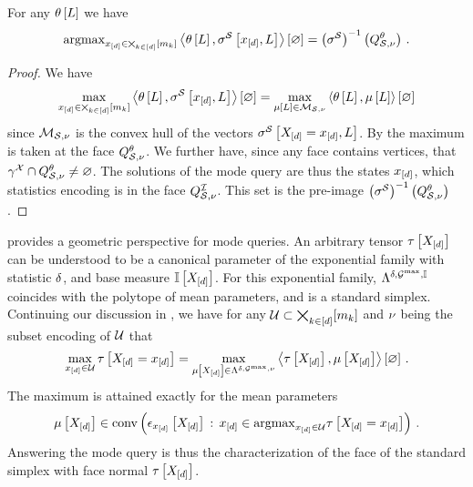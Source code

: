 \begin{theorem}
    \label{the:modeQueryFaceBM}
    For any $\theta\left[L\right]$ we have
    \begin{align*}
        \mathrm{argmax}_{x_{[d]}\in\bigtimes_{k\in[d]}[m_{k}]} \left\langle \theta\left[L\right],\sigma^{\mathcal{S}}\left[x_{[d]},L\right]\right\rangle \left[ \varnothing \right] =
        \left(\sigma^{\mathcal{S}}\right)^{-1}\left(Q^{\theta}_{\mathcal{S},\nu}\right) \, .
    \end{align*}
\end{theorem}
\begin{proof}
    We have
    \begin{align*}
        \max_{x_{[d]}\in\bigtimes_{k\in[d]}[m_{k}]} \left\langle \theta\left[L\right],\sigma^{\mathcal{S}}\left[x_{[d]},L\right]\right\rangle \left[ \varnothing \right] =
        \max_{\mu\left[L\right]\in\mathcal{M}_{\mathcal{S},\nu}} \left\langle \theta\left[L\right],\mu\left[L\right]\right\rangle \left[ \varnothing \right]
    \end{align*}
    since $\mathcal{M}_{\mathcal{S},\nu}$ is the convex hull of the vectors $\sigma^{\mathcal{S}}\left[X_{[d]}=x_{[d]},L\right]$.
    By  the maximum is taken at the face $Q^{\theta}_{\mathcal{S},\nu}$.
    We further have, since any face contains vertices, that $\gamma^{\mathcal{X}}\cap Q^{\theta}_{\mathcal{S},\nu}\neq\varnothing$.
    The solutions of the mode query are thus the states $x_{[d]}$, which statistics encoding is in the face $Q^{\mathcal{I}}_{\mathcal{S},\nu}$.
    This set is the pre-image $\left(\sigma^{\mathcal{S}}\right)^{-1}\left(Q^{\theta}_{\mathcal{S},\nu}\right)$.
\end{proof}

 provides a geometric perspective for mode queries.
An arbitrary tensor $\tau\left[X_{[d]}\right]$ can be understood to be a canonical parameter of the exponential family with statistic $\delta$, and base measure $\mathbb{I}\left[X_{[d]}\right]$.
For this exponential family, $\Lambda^{\delta,\mathcal{G}^{\mathrm{max}},\mathbb{I}}$ coincides with the polytope of mean parameters, and is a standard simplex.
Continuing our discussion in , we have for any $\mathcal{U}\subset\bigtimes_{k\in[d]}[m_{k}]$ and $\nu$ being the subset encoding of $\mathcal{U}$ that
\begin{align*}
    \max_{x_{[d]}\in\mathcal{U}} \tau\left[X_{[d]}=x_{[d]}\right] =
    \max_{\mu\left[X_{[d]}\right]\in\Lambda^{\delta,\mathcal{G}^{\mathrm{max}},\nu}} \left\langle \tau\left[X_{[d]}\right],\mu\left[X_{[d]}\right]\right\rangle \left[ \varnothing \right] \, .
\end{align*}
The maximum is attained exactly for the mean parameters
\begin{align*}
    \mu\left[X_{[d]}\right]\in
    \mathrm{conv}\left(\epsilon_{x_{[d]}}\left[X_{[d]}\right] \, : \, x_{[d]}\in\mathrm{argmax}_{x_{[d]}\in\mathcal{U}} \tau\left[X_{[d]}=x_{[d]}\right]\right) \, .
\end{align*}
Answering the mode query is thus the characterization of the face of the standard simplex with face normal $\tau\left[X_{[d]}\right]$.

